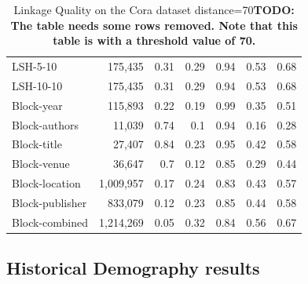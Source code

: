 \documentclass{llncs}
\begin{document}
\begin{table}[ht]
\begin{tabular}{l|r|r|r|r|r|r}
LSH-5-10           &  175,435                     & 0.31                  & 0.29                       & 0.94      & 0.53   & 0.68       \\
LSH-10-10          &  175,435                     & 0.31                  & 0.29                       & 0.94      & 0.53   & 0.68       \\  \hline
Block-year      &  115,893                     & 0.22                  & 0.19                       & 0.99      & 0.35   & 0.51       \\
Block-authors   &   11,039                      & 0.74                  & 0.1                        & 0.94      & 0.16   & 0.28       \\
Block-title     &   27,407                      & 0.84                  & 0.23                       & 0.95      & 0.42   & 0.58       \\
Block-venue     &   36,647                      & 0.7                   & 0.12                       & 0.85      & 0.29   & 0.44       \\
Block-location  & 1,009,957                    & 0.17                  & 0.24                       & 0.83      & 0.43   & 0.57       \\
Block-publisher &  833,079                     & 0.12                  & 0.23                       & 0.85      & 0.44   & 0.58       \\
Block-combined  & 1,214,269                    & 0.05                  & 0.32                       & 0.84      & 0.56   & 0.67       \\ \hline
\end{tabular}
\caption{Linkage Quality on the Cora dataset distance=70\label{comparison-of-results-cora}
\textbf{TODO: The table needs some rows removed. Note that this table is with a threshold value of 70.}
}
\end{table}



\subsection{Historical Demography results}
\end{document}
